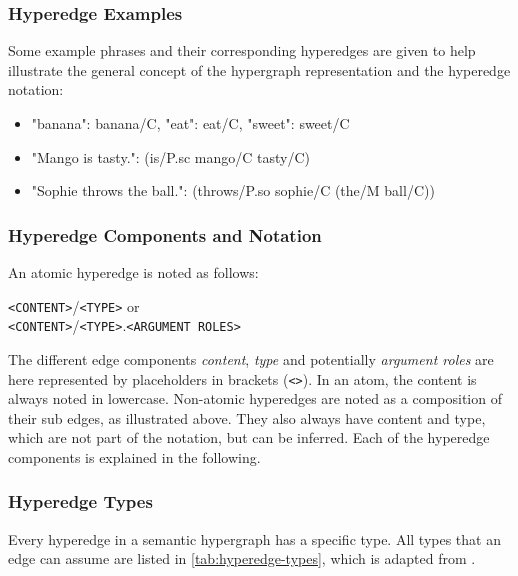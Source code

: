 \documentclass[11pt]{scrreprt}
\let\citef\cite  %
\let\cite\parencite  %
\begin{document}
\subsubsection{Hyperedge Examples}
Some example phrases and their corresponding hyperedges are given to help illustrate the general concept of the hypergraph representation and the hyperedge notation:

\begin{itemize}
	\item "banana": \textsf{banana/C}, "eat": \textsf{eat/C}, "sweet": \textsf{sweet/C}
	\item "Mango is tasty.": \textsf{(is/P.sc mango/C tasty/C)}
	\item "Sophie throws the ball.": \textsf{(throws/P.so sophie/C (the/M ball/C))}
\end{itemize}


\subsubsection{Hyperedge Components and Notation}
\label{sec:hyperedge-notation}
An atomic hyperedge is noted as follows:

\begin{center}
	\texttt{<CONTENT>}\textsf{/}\texttt{<TYPE>} or \\
	\texttt{<CONTENT>}\textsf{/}\texttt{<TYPE>}\textsf{.}\texttt{<ARGUMENT ROLES>}
\end{center}

The different edge components \textit{content}, \textit{type} and potentially \textit{argument roles} are here represented by placeholders in brackets (\texttt{<>}). In an atom, the content is always noted in lowercase. Non-atomic hyperedges are noted as a composition of their sub edges, as illustrated above. They also always have content and type, which are not part of the notation, but can be inferred. Each of the hyperedge components is explained in the following.

\subsubsection{Hyperedge Types}
Every hyperedge in a semantic hypergraph has a specific type. All types that an edge can assume are listed in \cref{tab:hyperedge-types}, which is adapted from \citef[p. 7]{menezesSemanticHypergraphs2021}.
\end{document}
